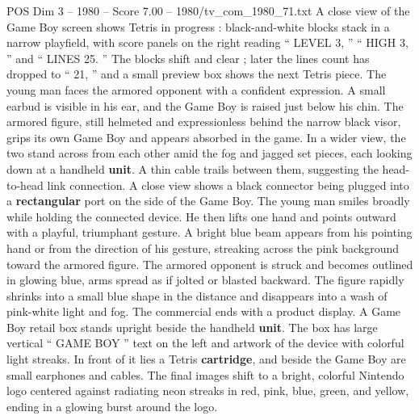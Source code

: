 \begin{textsample}{POS Dim 3 – 1980 – Score 7.00 – 1980/tv\_com\_1980\_71.txt}
A close view of the Game Boy screen shows Tetris in progress : black-and-white blocks stack in a narrow playfield, with score panels on the right reading “ LEVEL 3, ” “ HIGH 3, ” and “ LINES 25. ” The blocks shift and clear ; later the lines count has dropped to “ 21, ” and a small preview box shows the next Tetris piece.
The young man faces the armored opponent with a confident expression.
A small earbud is visible in his ear, and the Game Boy is raised just below his chin.
The armored figure, still helmeted and expressionless behind the narrow black visor, grips its own Game Boy and appears absorbed in the game.
In a wider view, the two stand across from each other amid the fog and jagged set pieces, each looking down at a handheld \textbf{unit}.
A thin cable trails between them, suggesting the head-to-head link connection.
A close view shows a black connector being plugged into a \textbf{rectangular} port on the side of the Game Boy.
The young man smiles broadly while holding the connected device.
He then lifts one hand and points outward with a playful, triumphant gesture.
A bright blue beam appears from his pointing hand or from the direction of his gesture, streaking across the pink background toward the armored figure.
The armored opponent is struck and becomes outlined in glowing blue, arms spread as if jolted or blasted backward.
The figure rapidly shrinks into a small blue shape in the distance and disappears into a wash of pink-white light and fog.
The commercial ends with a product display.
A Game Boy retail box stands upright beside the handheld \textbf{unit}.
The box has large vertical “ GAME BOY ” text on the left and artwork of the device with colorful light streaks.
In front of it lies a Tetris \textbf{cartridge}, and beside the Game Boy are small earphones and cables.
The final images shift to a bright, colorful Nintendo logo centered against radiating neon streaks in red, pink, blue, green, and yellow, ending in a glowing burst around the logo.

\end{textsample}

